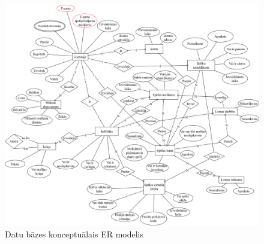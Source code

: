 \begin{figure}[h]
	\centering
	\includegraphics[width=\linewidth]{./src/requirements/img/conceptual_model.png}
	\caption{Datu bāzes konceptuālais ER modelis}
	\label{fig:conceptual_model}
\end{figure}
